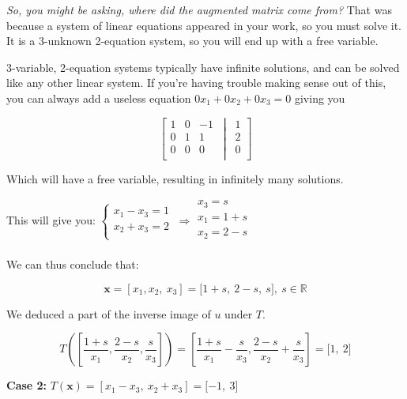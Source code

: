 \documentclass[12pt]{article}
\theoremstyle{plain}
\theoremstyle{remark}
\theoremstyle{definition}
\begin{document}
\emph{So, you might be asking, where did the augmented matrix come
from?} That was because a system of linear equations appeared in your
work, so you must solve it. It is a 3-unknown 2-equation system, so you
will end up with a free variable.

3-variable, 2-equation systems typically have infinite solutions, and
can be solved like any other linear system. If you're having trouble
making sense out of this, you can always add a useless equation
\(0x_{1} + 0x_{2} + 0x_{3} = 0\) giving you

\[\left\lbrack \begin{matrix}
1 & 0 & - 1 \\
0 & 1 & 1 \\
0 & 0 & 0 \\
\end{matrix}\, \middle| \,\begin{matrix}
1 \\
2 \\
0 \\
\end{matrix} \right\rbrack\]

Which will have a free variable, resulting in infinitely many solutions.

This will give you: \(\left\{ \begin{matrix}
x_{1} - x_{3} = 1 \\
x_{2} + x_{3} = 2 \\
\end{matrix} \right.\  \Rightarrow \begin{matrix}
x_{3} = s \\
x_{1} = 1 + s \\
x_{2} = 2 - s \\
\end{matrix}\)

We can thus conclude that:

\[\mathbf{x} = \left\lbrack x_{1},x_{2},\ x_{3} \right\rbrack = \lbrack 1 + s,\ 2 - s,\ s\rbrack,\ s\mathbb{\in R}\]

We deduced a part of the inverse image of \(u\) under \(T\).

\[T\left( \left\lbrack \frac{1 + s}{x_{1}},\frac{2 - s}{x_{2}},\frac{s}{x_{3}} \right\rbrack \right) = \left\lbrack \frac{1 + s}{x_{1}} - \frac{s}{x_{3}},\frac{2 - s}{x_{2}} + \frac{s}{x_{3}} \right\rbrack = \lbrack 1,\ 2\rbrack\]

\textbf{Case 2:}
\(T\left( \mathbf{x} \right) = \left\lbrack x_{1} - x_{3},\ x_{2} + x_{3} \right\rbrack = \lbrack - 1,\ 3\rbrack\)
\end{document}
